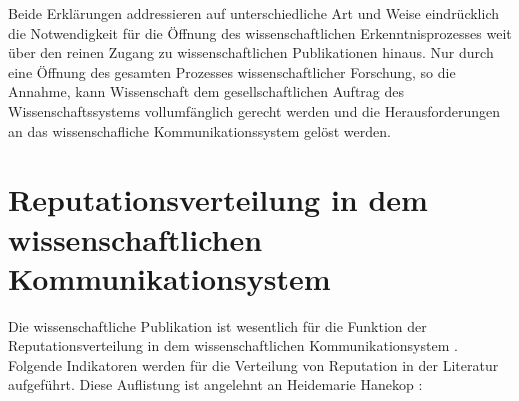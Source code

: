 Beide Erklärungen addressieren auf unterschiedliche Art und Weise eindrücklich die Notwendigkeit für die Öffnung des wissenschaftlichen Erkenntnisprozesses weit über den reinen Zugang zu wissenschaftlichen Publikationen hinaus. Nur durch eine Öffnung des gesamten Prozesses wissenschaftlicher Forschung, so die Annahme, kann Wissenschaft dem gesellschaftlichen Auftrag des Wissenschaftssystems vollumfänglich gerecht werden und die Herausforderungen an das wissenschafliche Kommunikationssystem gelöst werden.

\section{Reputationsverteilung in dem wissenschaftlichen Kommunikationsystem}

Die wissenschaftliche Publikation ist wesentlich für die Funktion der Reputationsverteilung in dem wissenschaftlichen Kommunikationsystem \cite{hirschauer2004peer}. Folgende Indikatoren werden für die Verteilung von Reputation in der Literatur aufgeführt. Diese Auflistung ist angelehnt an Heidemarie Hanekop \cite{hanekop_2008}:
